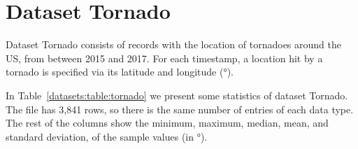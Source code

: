 
\vspace{-25pt}
\section{Dataset Tornado}
\label{datasets:tornado}


Dataset Tornado \cite{dataset:spc} consists of records with the location of tornadoes around the US, from between 2015 and 2017. For each timestamp, a location hit by a tornado is specified via its latitude and longitude (°). \SPCDef


In Table~\ref{datasets:table:tornado} we present some statistics of dataset Tornado. \SPCTable The file has 3,841 rows, so there is the same number of entries of each data type. The rest of the columns show the minimum, maximum, median, mean, and standard deviation, of the sample values (in °).




